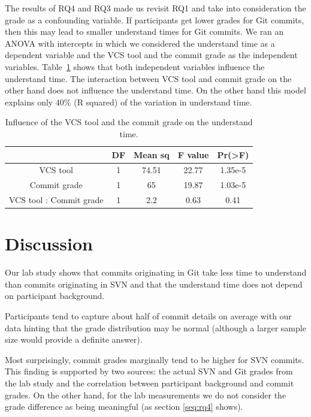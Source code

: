\documentclass[letterpaper]{article}
\begin{document}
The results of RQ4 and RQ3 made us revisit RQ1 and take into consideration the grade as a confounding variable.
If participants get lower grades for Git commits, then this may lead to smaller understand times for Git commits.
We ran an ANOVA with intercepts in which we considered the understand time as a dependent variable and the VCS tool and the commit grade as the independent variables.
Table~\ref{tab:rq4_anovas} shows that both independent variables influence the understand time.
The interaction between VCS tool and commit grade on the other hand does not influence the understand time.
On the other hand this model explains only 40\% (R squared) of the variation in understand time.

\begin{table}[H]
	\centering
	\begin{tabular}{c | c c c c}
											& DF	&	Mean sq	&	F value	&	Pr(\textgreater F)	\\ \hline
	VCS tool 							& 1	&	74.51		&	22.77	&	1.35e-5					\\ 
	Commit grade					& 1	&	65			&	19.87	&	1.03e-5					\\
	VCS tool : Commit grade	& 1	&	2.2			&	0.63	&	0.41						\\
	\end{tabular}
	\caption{Influence of the VCS tool and the commit grade on the understand time.}
	\label{tab:rq4_anovas}
\end{table}

\section{Discussion}

Our lab study shows that commits originating in Git take less time to understand than commits originating in SVN and that the understand time does not depend on participant background.

Participants tend to capture about half of commit details on average with our data hinting that the grade distribution may be normal (although a larger sample size would provide a definite answer).

Most surprisingly, commit grades marginally tend to be higher for SVN commits.
This finding is supported by two sources: the actual SVN and Git grades from the lab study and the correlation between participant background and commit grades.
On the other hand, for the lab measurements we do not consider the grade difference as being meaningful (as section \ref{seq:rq4} shows).
\end{document}
